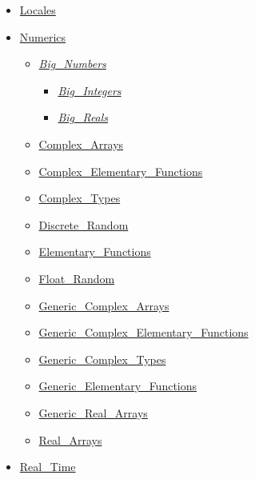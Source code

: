\documentclass[english]{article}
\begin{document}
\begin{scriptsize}
\begin{multicols*}{5}
\begin{itemize}[leftmargin=0mm]
\begin{itemize}[leftmargin=5mm]
  \item[] \href{http://www.ada-auth.org/standards/22rm/html/RM-A-19.html}{Locales}
  \item[] \href{http://www.ada-auth.org/standards/22rm/html/RM-A-5.html}{Numerics}
	\begin{itemize}[leftmargin=5mm]
	\item[] \href{http://www.ada-auth.org/standards/22rm/html/RM-A-5-5.html}{\textit{Big\_Numbers}}
	  \begin{itemize}[leftmargin=5mm]
	  \item[] \href{http://www.ada-auth.org/standards/22rm/html/RM-A-5-6.html}{\textit{Big\_Integers}}
	  \item[] \href{http://www.ada-auth.org/standards/22rm/html/RM-A-5-7.html}{\textit{Big\_Reals}}
	  \end{itemize}
	\item[] \href{http://www.ada-auth.org/standards/22rm/html/RM-G-3-2.html}{Complex\_Arrays}
	\item[] \href{http://www.ada-auth.org/standards/22rm/html/RM-G-1-2.html}{Complex\_Elementary\_Functions}
	\item[] \href{http://www.ada-auth.org/standards/22rm/html/RM-G-1-1.html}{Complex\_Types}
	\item[] \href{http://www.ada-auth.org/standards/22rm/html/RM-A-5-2.html}{Discrete\_Random}
	\item[] \href{http://www.ada-auth.org/standards/22rm/html/RM-A-5-1.html}{Elementary\_Functions}
	\item[] \href{http://www.ada-auth.org/standards/22rm/html/RM-A-5-2.html}{Float\_Random}
	\item[] \href{http://www.ada-auth.org/standards/22rm/html/RM-G-3-2.html}{Generic\_Complex\_Arrays}
	\item[] \href{http://www.ada-auth.org/standards/22rm/html/RM-G-1-2.html}{Generic\_Complex\_Elementary\_Functions}
	\item[] \href{http://www.ada-auth.org/standards/22rm/html/RM-G-1-1.html}{Generic\_Complex\_Types}
	\item[] \href{http://www.ada-auth.org/standards/22rm/html/RM-A-5-1.html}{Generic\_Elementary\_Functions}
	\item[] \href{http://www.ada-auth.org/standards/22rm/html/RM-G-3-1.html}{Generic\_Real\_Arrays}
	\item[] \href{http://www.ada-auth.org/standards/22rm/html/RM-G-3-1.html}{Real\_Arrays}
	\end{itemize}
  \item[] \href{http://www.ada-auth.org/standards/22rm/html/RM-D-8.html}{Real\_Time}

\end{itemize}
\end{itemize}
\end{multicols*}
\end{scriptsize}
\end{document}
